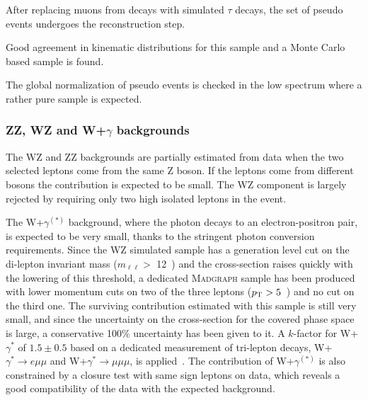 After replacing muons from \dymm decays with simulated $\tau$ decays,
the set of pseudo \dytt events undergoes the reconstruction step.
 
Good agreement in kinematic distributions for this sample
and a Monte Carlo based \dytt sample is found.
 
The global normalization of pseudo \dytt events is 
checked in the low \mt spectrum where a rather pure
\dytt sample is expected.


	\subsubsection{ZZ, WZ and W+\texorpdfstring{$\gamma$}{gamma} backgrounds\label{sec:otherbkg}}

The WZ and ZZ backgrounds are partially estimated from data when the two
selected leptons come from the same Z boson. If the leptons come from different
bosons the contribution is expected to be small. The WZ component is largely
rejected by requiring only two high \pt isolated leptons in the event. 

The W+$\gamma^{(*)}$ background, where the photon decays to an electron-positron pair,
is expected to be very small, thanks to the stringent photon conversion
requirements.
 Since the WZ simulated sample has a generation level cut on the
di-lepton invariant mass ($m_{\ell\ell} >$ 12~\GeV) and the cross-section raises
quickly with the lowering of this threshold, a dedicated \textsc{Madgraph} sample has
been produced with lower momentum cuts on two of the three leptons
($p_\mathrm{T} > 5$~\GeV) and no cut on the third one. The surviving contribution
estimated with this sample is still very small, and since the uncertainty on the
cross-section for the covered phase space is large, a conservative 100\%
uncertainty has been given to it. 
A $k$-factor for W+$\gamma^{*}$ of $1.5\pm0.5$ based on a dedicated measurement of 
tri-lepton decays, W+$\gamma^{*} \to e\mu\mu$ and W+$\gamma^{*} \to \mu\mu\mu$,
is applied~\cite{WGammaStarStudy}. 
The contribution of W+$\gamma^{(*)}$ is also
constrained by a closure test with same sign leptons on data, which reveals a
good compatibility of the data with the expected background.

